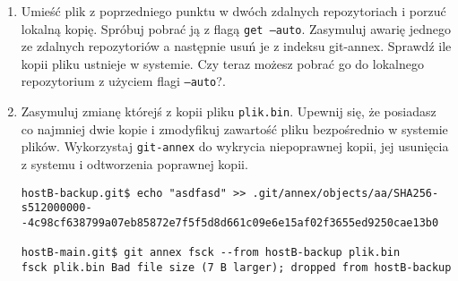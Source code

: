 \documentclass[polish]{article}
\newif\ifteacher
\begin{document}
\begin{enumerate}
\ifteacher
    \begin{lstlisting}
hostB:hostB-main.git$ git config annex.numcopies 2 # config sie nie propaguje przy sync'u
hostB:hostB-main.git$ git annex copy important_file.txt --to hostA-main
hostB:hostB-main.git$ git annex drop important_file.txt
drop important_file.txt (checking hostA-main...) (unsafe)
  Could only verify the existence of 1 out of 2 necessary copies

  No other repository is known to contain the file.

  (Use --force to override this check, or adjust annex.numcopies.)
failed
git-annex: drop: 1 failed
    \end{lstlisting}
\fi

    \item
    Umieść plik z poprzedniego punktu w dwóch zdalnych repozytoriach i porzuć
    lokalną kopię. Spróbuj pobrać ją z flagą \texttt{get --auto}. Zasymuluj
    awarię jednego ze zdalnych repozytoriów a następnie usuń je z indeksu
    git-annex. Sprawdź ile kopii pliku ustnieje w systemie. Czy teraz możesz
    pobrać go do lokalnego repozytorium z użyciem flagi \texttt{--auto}?.

\ifteacher
    \begin{lstlisting}
[root@lab429-08 hostB-main.git]# git annex get --auto plik.bin
get plik.bin (from hostB-backup...) SHA256-s512000000--4c98cf638799a07eb85872e7f5f5d8d661c09e6e15af02f3655ed9250cae13b0
512000000 100\% 56.26MB/s 0:00:08 (xfer#1, to-check=0/1)

sent 512062644 bytes received 31 bytes 53901334.21 bytes/sec
total size is 512000000 speedup is 1.00
ok
(Recording state in git...)
    \end{lstlisting}
\fi

    \item
    Zasymuluj zmianę którejś z kopii pliku \texttt{plik.bin}.
    Upewnij się, że posiadasz co najmniej dwie kopie i zmodyfikuj zawartość
    pliku bezpośrednio w systemie plików.
    Wykorzystaj \texttt{git-annex} do wykrycia niepoprawnej kopii, jej
    usunięcia z systemu i odtworzenia poprawnej kopii.

\ifteacher
    \begin{lstlisting}
hostB-backup.git$ echo "asdfasd" >> .git/annex/objects/aa/SHA256-s512000000--4c98cf638799a07eb85872e7f5f5d8d661c09e6e15af02f3655ed9250cae13b0

hostB-main.git$ git annex fsck --from hostB-backup plik.bin
fsck plik.bin Bad file size (7 B larger); dropped from hostB-backup


\end{lstlisting}
\end{enumerate}
\end{document}
